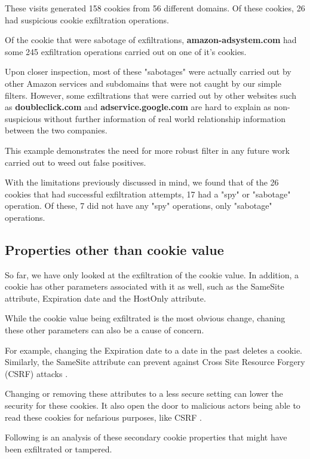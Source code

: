\documentclass[sigplan,screen]{acmart}
\begin{document}
These visits generated 158 cookies from 56 different domains. Of these cookies, 26 had suspicious cookie exfiltration operations.

Of the cookie that were sabotage of exfiltrations, \textbf{amazon-adsystem.com} had some 245 exfiltration operations carried out on one  of it's cookies.

Upon closer inspection, most of these "sabotages" were actually carried out by other Amazon services and subdomains that were not caught by our simple filters. However, some exfiltrations that were carried out by other websites such as \textbf{doubleclick.com} and \textbf{adservice.google.com} are hard to explain as non-suspicious without further information of real world relationship information between the two companies.

This example demonstrates the need for more robust filter in any future work carried out to weed out false positives.

With the limitations previously discussed in mind, we found that of the 26 cookies that had successful exfiltration attempts, 17 had a "spy" or "sabotage" operation. Of these, 7 did not have any "spy" operations, only "sabotage" operations.

\subsection*{Properties other than cookie value}

So far, we have only looked at  the exfiltration of the cookie value. In addition, a cookie has other parameters associated with it as well, such as the SameSite attribute, Expiration date and the HostOnly attribute.

While the cookie value being exfiltrated is the most obvious change, chaning these other parameters can also be a cause of concern.

For example, changing the Expiration date to a date in the past deletes a cookie. Similarly, the SameSite attribute can prevent against Cross Site Resource Forgery (CSRF) attacks \cite{csrf}. 

Changing or removing these attributes to a less secure setting can lower the security for these cookies. It also open the door to  malicious actors being able to read these cookies for nefarious purposes, like CSRF \cite{csrf}. 

Following is an analysis of these secondary cookie properties that might have been exfiltrated or tampered.
\end{document}
